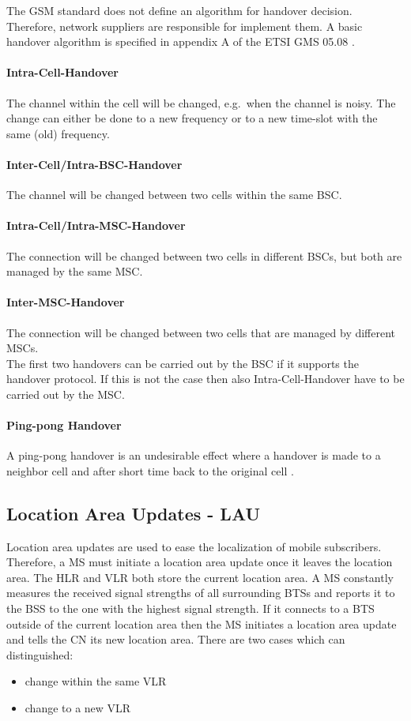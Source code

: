 The GSM standard does not define an algorithm for handover decision. Therefore, network suppliers are responsible for implement them. A basic handover algorithm is specified in appendix A of the ETSI GMS 05.08 \cite{Etsi19942}.
\paragraph{Intra-Cell-Handover} The channel within the cell will be changed, e.g.\ when the channel is noisy. The change can either be done to a new frequency or to a new time-slot with the same (old) frequency.
\paragraph{Inter-Cell/Intra-BSC-Handover}
The channel will be changed between two cells within the same BSC.
\paragraph{Intra-Cell/Intra-MSC-Handover}
The connection will be changed between two cells in different BSCs, but both are managed by the same MSC.
\paragraph{Inter-MSC-Handover}
The connection will be changed between two cells that are managed by different MSCs.
\\

The first two handovers can be carried out by the BSC if it supports the handover protocol. If this is not the case then also Intra-Cell-Handover have to be carried out by the MSC.

\paragraph{Ping-pong Handover}
A ping-pong handover is an undesirable effect where a handover is made to a neighbor cell and after short time back to the original cell \cite{Junius1995}.
\subsection{Location Area Updates - LAU}
Location area updates are used to ease the localization of mobile subscribers. Therefore, a MS must initiate a location area update once it leaves the location area. The HLR and VLR both store the current location area. A MS constantly measures the received signal strengths of all surrounding BTSs and reports it to the BSS to the one with the highest signal strength. If it connects to a BTS outside of the current location area then the MS initiates a location area update and tells the CN its new location area.
There are two cases which can distinguished:
\begin{itemize}
	\item change within the same VLR
	\item change to a new VLR
\end{itemize}

